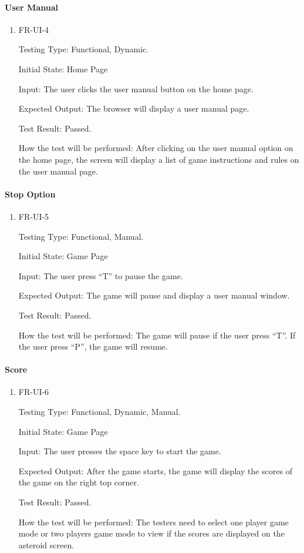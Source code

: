 \documentclass[12pt, titlepage]{article}
\begin{document}
\paragraph{User Manual}
\begin{enumerate}					
\item{FR-UI-4\\}

Testing Type: Functional, Dynamic.  

Initial State: Home Page

Input: The user clicks the user manual button on the home page.

Expected Output: The browser will display a user manual page.

Test Result: Passed.

How the test will be performed: After clicking on the user manual option on the home page, the screen will display a list of game instructions and rules on the user manual page.
\\
\end{enumerate}

\paragraph{Stop Option}
\begin{enumerate}					
\item{FR-UI-5\\}

Testing Type: Functional, Manual.  

Initial State: Game Page

Input: The user press “T” to pause the game.

Expected Output: The game will pause and display a user manual window.

Test Result: Passed.

How the test will be performed: The game will pause if the user press “T”. If the user press “P”, the game will resume.

\end{enumerate}

\paragraph{Score}
\begin{enumerate}					
\item{FR-UI-6\\}

Testing Type: Functional, Dynamic, Manual.  

Initial State: Game Page

Input: The user presses the space key to start the game.

Expected Output: After the game starts, the game will display the scores of the game on the right top corner.

Test Result: Passed.

How the test will be performed: The testers need to select one player game mode or two players game mode to view if the scores are displayed on the asteroid screen.
\\
\end{enumerate}
\end{document}
